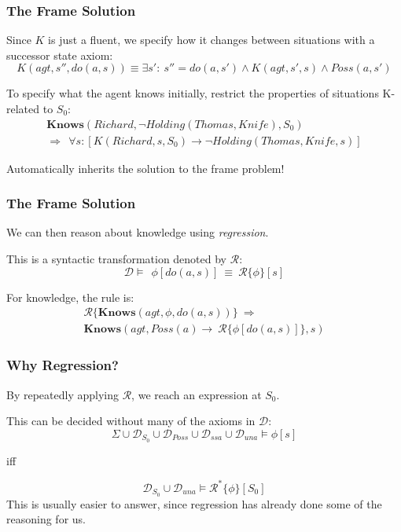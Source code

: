 \documentclass{beamer}
\begin{document}
\begin{frame}
\frametitle{The Frame Solution}
Since $K$ is just a fluent, we specify how it changes  between situations
with a successor state axiom:
\begin{equation*}
 K(agt,s'',do(a,s)) \equiv \exists s': \ s''=do(a,s')
 \wedge K(agt,s',s) \wedge Poss(a,s')
\end{equation*}

To specify what the agent knows initially, restrict the properties of situations
K-related to $S_0$:
\begin{gather*}
  \mathbf{Knows}(Richard,\neg Holding(Thomas,Knife),S_0) \\
  \Rightarrow \ \ \forall s: \left[K(Richard,s,S_0) \rightarrow \neg Holding(Thomas,Knife,s) \right]
\end{gather*}

Automatically inherits the solution to the frame problem!
\end{frame}

\begin{frame}
\frametitle{The Frame Solution}
We can then reason about knowledge using \emph{regression}.

This is a syntactic transformation denoted by $\mathcal{R}$:
\begin{equation*}
\mathcal{D} \models\ \ \phi[do(a,s)]\ \equiv\ \mathcal{R}\{\phi\}[s]
\end{equation*}

\pause
For knowledge, the rule is:
\begin{multline*}
  \mathcal{R}\{\mathbf{Knows}(agt,\phi,do(a,s))\}\ \Rightarrow\ \\
    \mathbf{Knows}(agt,Poss(a) \rightarrow\ \mathcal{R}\{\phi[do(a,s)]\},s)
\end{multline*}
\end{frame}

\begin{frame}
\frametitle{Why Regression?}
By repeatedly applying $\mathcal{R}$, we reach an expression at $S_0$.

This can be decided without many of the axioms in $\mathcal{D}$:
\begin{equation*}
  \Sigma \cup \mathcal{D}_{S_0} \cup \mathcal{D}_{Poss} \cup \mathcal{D}_{ssa} \cup \mathcal{D}_{una} \models \phi[s]
\end{equation*}
\begin{center}
iff
\end{center}
\begin{equation*}
  \mathcal{D}_{S_0} \cup \mathcal{D}_{una} \models \mathcal{R}^{*}\{\phi\}[S_0]
\end{equation*}
This is usually easier to answer, since regression has already done some
of the reasoning for us.
\end{frame}
\end{document}
